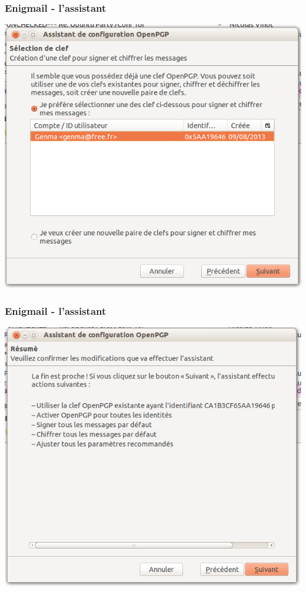 \documentclass{beamer}
\begin{document}
\begin{frame}
\frametitle{Enigmail - l'assistant}
\begin{center}
\includegraphics[scale=0.3] {./images/Assistant06.png}
\end{center}
\end{frame}

\begin{frame}
\frametitle{Enigmail - l'assistant}
\begin{center}
\includegraphics[scale=0.3] {./images/Assistant07.png}
\end{center}
\end{frame}
\end{document}
